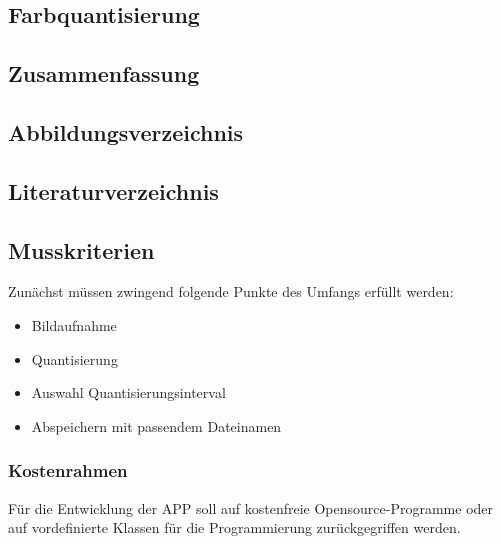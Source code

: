 \subsection{\textbf{Farbquantisierung}}

\subsection{\textbf{Zusammenfassung}}

\subsection{\textbf{Abbildungsverzeichnis}}

\subsection{\textbf{Literaturverzeichnis}}

   



\subsection{\textbf{Musskriterien}}

Zunächst müssen zwingend folgende Punkte des Umfangs erfüllt werden:

\begin{itemize}
   	\item Bildaufnahme
   	\item Quantisierung
   	\item Auswahl Quantisierungsinterval
   	\item Abspeichern mit passendem Dateinamen 
\end{itemize}

%

\subsubsection{Kostenrahmen}

Für die Entwicklung der \acs{APP} soll auf kostenfreie Opensource-Programme oder auf vordefinierte Klassen für die Programmierung zurückgegriffen werden.


